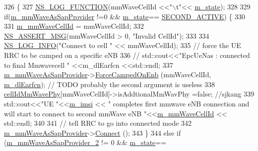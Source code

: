 \begin{DoxyCode}
326 \{
327   \hyperlink{log-macros-disabled_8h_a90b90d5bad1f39cb1b64923ea94c0761}{NS\_LOG\_FUNCTION}(mmWaveCellId <<\textcolor{stringliteral}{"\(\backslash\)t"}<< \hyperlink{classns3_1_1EpcUeNas_a1717ecab2177c959111e14fdad7972d0}{m\_state});
328 
329   \textcolor{keywordflow}{if}(\hyperlink{classns3_1_1EpcUeNas_a3d486b3112753b9e0ade53e1d546e546}{m\_mmWaveAsSapProvider} !=0 && \hyperlink{classns3_1_1EpcUeNas_a1717ecab2177c959111e14fdad7972d0}{m\_state}==
      \hyperlink{classns3_1_1EpcUeNas_a8047255fecfac11c9e1abe6f13d527dca030e2ae6d3c62c94c68fadd74bf5bf95}{SECOND\_ACTIVE}) \{
330 
331           \hyperlink{classns3_1_1EpcUeNas_ae574d1d6cae34ecde7a1083b36b6d19b}{m\_mmWaveCellId} = mmWaveCellId;
332     \hyperlink{assert_8h_aff5ece9066c74e681e74999856f08539}{NS\_ASSERT\_MSG}(mmWaveCellId > 0, \textcolor{stringliteral}{"Invalid CellId"});
333 
334     \hyperlink{group__logging_gafbd73ee2cf9f26b319f49086d8e860fb}{NS\_LOG\_INFO}(\textcolor{stringliteral}{"Connect to cell "} << mmWaveCellId);
335     \textcolor{comment}{// force the UE RRC to be camped on a specific eNB}
336   \textcolor{comment}{//  std::cout<<"EpcUeNas : connected to final Mmwavecell  " <<m\_dlEarfcn <<std::endl;}
337     \hyperlink{classns3_1_1EpcUeNas_a3d486b3112753b9e0ade53e1d546e546}{m\_mmWaveAsSapProvider}->\hyperlink{classns3_1_1LteAsSapProvider_ac9b1946e31e8ad613ed1c3c845d7af9b}{ForceCampedOnEnb} (mmWaveCellId, 
      \hyperlink{classns3_1_1EpcUeNas_a4c7c7d17d9ac2bc5481f367a218d7d33}{m\_dlEarfcn}); \textcolor{comment}{// TODO probably the second argument is useless}
338     \hyperlink{classns3_1_1EpcUeNas_aea90c088e28cdee40e99e9bc6ef690f2}{cellIdMmWavePhy}[mmWaveCellId]->isAddtionalMmWavPhy =\textcolor{keyword}{false}; \textcolor{comment}{//sjkang}
339     std::cout<<\textcolor{stringliteral}{"UE "}<<\hyperlink{classns3_1_1EpcUeNas_a0d541bfcaf7775052a7889bbd706fe02}{m\_imsi} << \textcolor{stringliteral}{" completes first mmwave eNB connection and  will start to connect to
       second mmWave eNB "}<<\hyperlink{classns3_1_1EpcUeNas_ae574d1d6cae34ecde7a1083b36b6d19b}{m\_mmWaveCellId} << std::endl;
340 
341     \textcolor{comment}{// tell RRC to go into connected mode}
342     \hyperlink{classns3_1_1EpcUeNas_a3d486b3112753b9e0ade53e1d546e546}{m\_mmWaveAsSapProvider}->\hyperlink{classns3_1_1LteAsSapProvider_aaaa9d78bc191b89ba8afa323baca67b0}{Connect} ();
343   \}
344   \textcolor{keywordflow}{else} \textcolor{keywordflow}{if} (\hyperlink{classns3_1_1EpcUeNas_a7abf79dbedc37b67f8fae923e1a89604}{m\_mmWaveAsSapProvider\_2} != 0 && \hyperlink{classns3_1_1EpcUeNas_a1717ecab2177c959111e14fdad7972d0}{m\_state}==

\end{DoxyCode}
